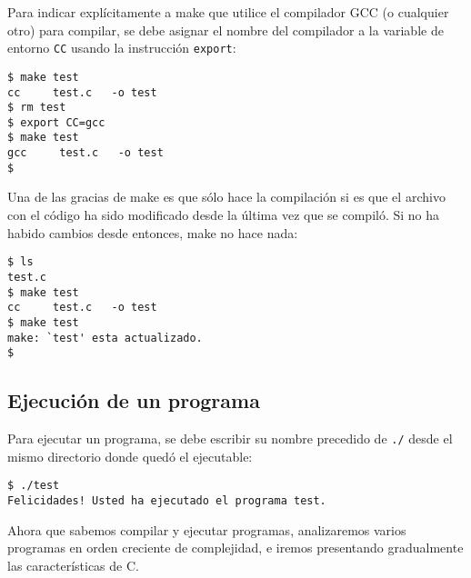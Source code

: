Para indicar explícitamente a make que utilice el compilador GCC (o
cualquier otro) para compilar, se debe asignar el nombre del compilador
a la variable de entorno \lstinline!CC! usando la instrucción
\lstinline!export!:

\begin{lstlisting}
$ make test
cc     test.c   -o test
$ rm test
$ export CC=gcc
$ make test
gcc     test.c   -o test
$
\end{lstlisting}

Una de las gracias de make es que sólo hace la compilación si es que el
archivo con el código ha sido modificado desde la última vez que se
compiló. Si no ha habido cambios desde entonces, make no hace nada:

\begin{lstlisting}
$ ls
test.c
$ make test
cc     test.c   -o test
$ make test
make: `test' esta actualizado.
$
\end{lstlisting}

\subsection{Ejecución de un programa}

Para ejecutar un programa, se debe escribir su nombre precedido de
\lstinline!./! desde el mismo directorio donde quedó el ejecutable:

\begin{lstlisting}
$ ./test
Felicidades! Usted ha ejecutado el programa test.
\end{lstlisting}

Ahora que sabemos compilar y ejecutar programas, analizaremos varios
programas en orden creciente de complejidad, e iremos presentando
gradualmente las características de C.
